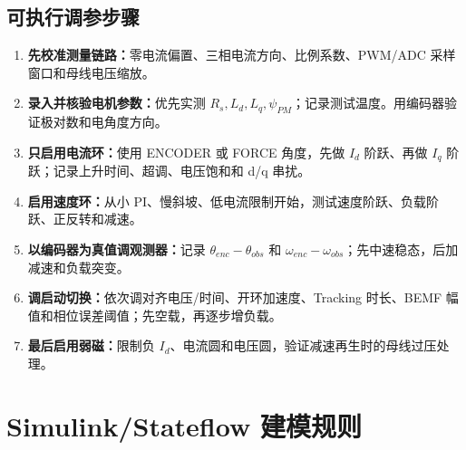 \documentclass[UTF8,a4paper,11pt,fontset=windows]{ctexart}
\begin{document}
\subsection{可执行调参步骤}
\begin{enumerate}
\item \textbf{先校准测量链路：}零电流偏置、三相电流方向、比例系数、PWM/ADC 采样窗口和母线电压缩放。
\item \textbf{录入并核验电机参数：}优先实测 $R_s,L_d,L_q,\psi_{PM}$；记录测试温度。用编码器验证极对数和电角度方向。
\item \textbf{只启用电流环：}使用 ENCODER 或 FORCE 角度，先做 $I_d$ 阶跃、再做 $I_q$ 阶跃；记录上升时间、超调、电压饱和和 d/q 串扰。
\item \textbf{启用速度环：}从小 PI、慢斜坡、低电流限制开始，测试速度阶跃、负载阶跃、正反转和减速。
\item \textbf{以编码器为真值调观测器：}记录 $\theta_{enc}-\theta_{obs}$ 和 $\omega_{enc}-\omega_{obs}$；先中速稳态，后加减速和负载突变。
\item \textbf{调启动切换：}依次调对齐电压/时间、开环加速度、Tracking 时长、BEMF 幅值和相位误差阈值；先空载，再逐步增负载。
\item \textbf{最后启用弱磁：}限制负 $I_d$、电流圆和电压圆，验证减速再生时的母线过压处理。
\end{enumerate}
\section{Simulink/Stateflow 建模规则}
\end{document}
